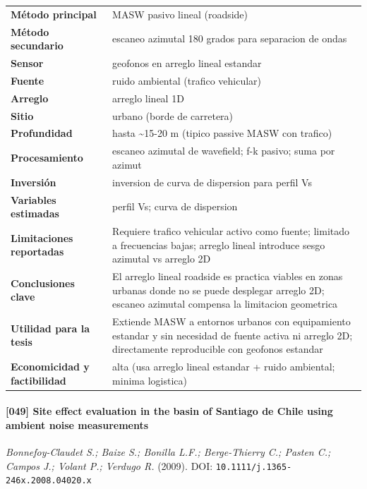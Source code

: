 \begin{center}\scriptsize
\begin{tabularx}{\textwidth}{@{}>{\bfseries}p{3.3cm} X@{}}
\toprule
M\'etodo principal & MASW pasivo lineal (roadside) \\
M\'etodo secundario & escaneo azimutal 180 grados para separacion de ondas \\
Sensor & geofonos en arreglo lineal estandar \\
Fuente & ruido ambiental (trafico vehicular) \\
Arreglo & arreglo lineal 1D \\
Sitio & urbano (borde de carretera) \\
Profundidad & hasta \textasciitilde{}15-20 m (tipico passive MASW con trafico) \\
Procesamiento & escaneo azimutal de wavefield; f-k pasivo; suma por azimut \\
Inversi\'on & inversion de curva de dispersion para perfil Vs \\
Variables estimadas & perfil Vs; curva de dispersion \\
Limitaciones reportadas & Requiere trafico vehicular activo como fuente; limitado a frecuencias bajas; arreglo lineal introduce sesgo azimutal vs arreglo 2D \\
Conclusiones clave & El arreglo lineal roadside es practica viables en zonas urbanas donde no se puede desplegar arreglo 2D; escaneo azimutal compensa la limitacion geometrica \\
Utilidad para la tesis & Extiende MASW a entornos urbanos con equipamiento estandar y sin necesidad de fuente activa ni arreglo 2D; directamente reproducible con geofonos estandar \\
Economicidad y factibilidad & alta (usa arreglo lineal estandar + ruido ambiental; minima logistica) \\
\bottomrule
\end{tabularx}
\end{center}

\paragraph{[049] Site effect evaluation in the basin of Santiago de Chile using ambient noise measurements} \emph{Bonnefoy-Claudet S.; Baize S.; Bonilla L.F.; Berge-Thierry C.; Pasten C.; Campos J.; Volant P.; Verdugo R.} (2009).
{\scriptsize DOI: \texttt{10.1111/j.1365-246x.2008.04020.x}}

